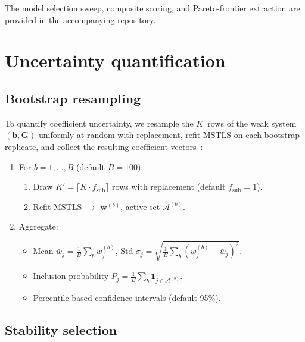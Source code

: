 The model selection sweep, composite scoring, and Pareto-frontier
extraction are provided in the accompanying repository.

\section{Uncertainty quantification}
\label{sec:uq}

\subsection{Bootstrap resampling}
\label{subsec:bootstrap}

To quantify coefficient uncertainty, we resample the $K$~rows of the weak
system $(\mathbf{b},\mathbf{G})$ uniformly at random with replacement,
refit MSTLS on each bootstrap replicate, and collect the resulting
coefficient vectors~\cite{messenger2021wsindy}:

\begin{enumerate}[nosep]
\item For $b=1,\dots,B$ (default $B=100$):
  \begin{enumerate}[nosep]
  \item Draw $K'=\lceil K\cdot f_{\mathrm{sub}}\rceil$ rows with
        replacement (default $f_{\mathrm{sub}}=1$).
  \item Refit MSTLS $\to$ $\mathbf{w}^{(b)}$, active set $\mathcal{A}^{(b)}$.
  \end{enumerate}
\item Aggregate:
  \begin{itemize}[nosep]
  \item Mean $\bar{w}_j = \frac{1}{B}\sum_b w_j^{(b)}$,\;
        Std $\sigma_j = \sqrt{\frac{1}{B}\sum_b(w_j^{(b)}-\bar{w}_j)^2}$.
  \item Inclusion probability
        $P_j = \frac{1}{B}\sum_b\mathbf{1}_{j\in\mathcal{A}^{(b)}}$.
  \item Percentile-based confidence intervals (default 95\%).
  \end{itemize}
\end{enumerate}

\subsection{Stability selection}
\label{subsec:stability}

